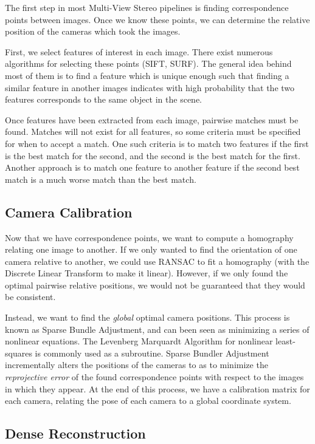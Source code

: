 \documentclass[10pt,twocolumn,letterpaper]{article}
\begin{document}
The first step in most Multi-View Stereo pipelines is finding correspondence points between images. Once we know these points, we can determine the relative position of the cameras which took the images.

First, we select features of interest in each image. There exist numerous algorithms for selecting these points (SIFT, SURF). The general idea behind most of them is to find a feature which is unique enough such that finding a similar feature in another images indicates with high probability that the two features corresponds to the same object in the scene.\cite{brown}

Once features have been extracted from each image, pairwise matches must be found. Matches will not exist for all features, so some criteria must be specified for when to accept a match. One such criteria is to match two features if the first is the best match for the second, and the second is the best match for the first. Another approach is to match one feature to another feature if the second best match is a much worse match than the best match.\cite{brown}

\subsection{Camera Calibration}

Now that we have correspondence points, we want to compute a homography relating one image to another. If we only wanted to find the orientation of one camera relative to another, we could use RANSAC to fit a homography (with the Discrete Linear Transform to make it linear).\cite{ransac} However, if we only found the optimal pairwise relative positions, we would not be guaranteed that they would be consistent.

Instead, we want to find the \emph{global} optimal camera positions. This process is known as Sparse Bundle Adjustment, and can been seen as minimizing a series of nonlinear equations. The  Levenberg Marquardt Algorithm for nonlinear least-squares is commonly used as a subroutine. Sparse Bundler Adjustment incrementally alters the positions of the cameras to as to minimize the \emph{reprojective error} of the found correspondence points with respect to the images in which they appear. At the end of this process, we have a calibration matrix for each camera, relating the pose of each camera to a global coordinate system.\cite{snavely, sba}

\subsection{Dense Reconstruction}
\end{document}
